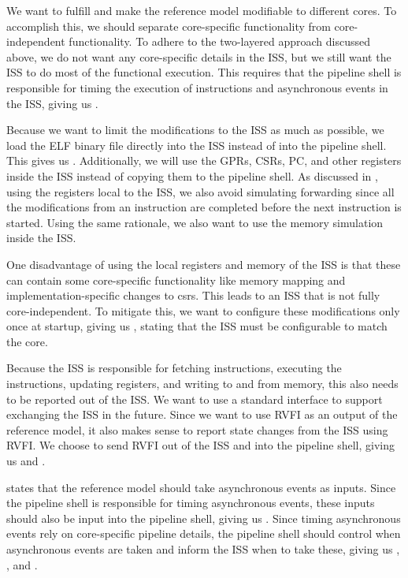 We want to fulfill  and make the reference model modifiable to different cores. To accomplish this, we should separate core-specific functionality from core-independent functionality. To adhere to the two-layered approach discussed above, we do not want any core-specific details in the ISS, but we still want the ISS to do most of the functional execution. This requires that the pipeline shell is responsible for timing the execution of instructions and asynchronous events in the ISS, giving us . 

Because we want to limit the modifications to the ISS as much as possible, we load the ELF binary file directly into the ISS instead of into the pipeline shell. This gives us . Additionally, we will use the GPRs, CSRs, PC, and other registers inside the ISS instead of copying them to the pipeline shell. As discussed in , using the registers local to the ISS, we also avoid simulating forwarding since all the modifications from an instruction are completed before the next instruction is started. Using the same rationale, we also want to use the memory simulation inside the ISS.

One disadvantage of using the local registers and memory of the ISS is that these can contain some core-specific functionality like memory mapping and imple\-mentation-specific changes to \acrshort{csr}s. This leads to an ISS that is not fully core-independent. To mitigate this, we want to configure these modifications only once at startup, giving us  , stating that the ISS must be configurable to match the core.

Because the ISS is responsible for fetching instructions, executing the instructions, updating registers, and writing to and from memory, this also needs to be reported out of the ISS. We want to use a standard interface to support exchanging the ISS in the future. Since we want to use RVFI as an output of the reference model, it also makes sense to report state changes from the ISS using RVFI. We choose to send RVFI out of the ISS and into the pipeline shell, giving us  and .

 states that the reference model should take asynchronous events as inputs. Since the pipeline shell is responsible for timing asynchronous events, these inputs should also be input into the pipeline shell, giving us . Since timing asynchronous events rely on core-specific pipeline details, the pipeline shell should control when asynchronous events are taken and inform the ISS when to take these, giving us , , and .

